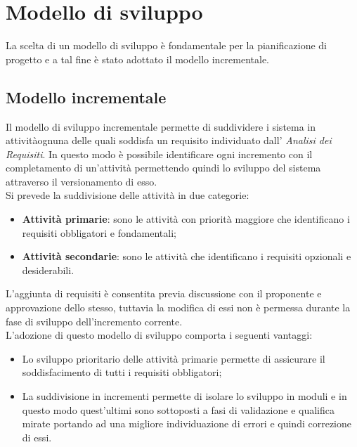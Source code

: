 \section{Modello di sviluppo}
La scelta di un modello di sviluppo è fondamentale per la pianificazione di 
progetto e a tal fine è stato adottato il modello incrementale.
\subsection{Modello incrementale}
Il modello di sviluppo incrementale permette di suddividere i sistema in 
attività\glosp ognuna delle quali soddisfa un requisito\glosp 
individuato dall' \textit{Analisi dei Requisiti}. In questo modo è possibile 
identificare ogni incremento con il completamento di un'attività permettendo 
quindi lo sviluppo del sistema attraverso il versionamento di esso. \\
Si prevede la suddivisione delle attività in due categorie: 
\begin{itemize}
	\item \textbf{Attività primarie}: sono le attività con priorità maggiore 
	che identificano i requisiti obbligatori e fondamentali;
	\item \textbf{Attività secondarie}: sono le attività che identificano i 
	requisiti opzionali e desiderabili.
\end{itemize}
L'aggiunta di requisiti è consentita previa discussione con il proponente e 
approvazione dello stesso, tuttavia la modifica di essi non è permessa 
durante la fase di sviluppo dell'incremento corrente.\\
L'adozione di questo modello di sviluppo comporta i seguenti vantaggi:
\begin{itemize}
	\item Lo sviluppo prioritario delle attività primarie permette di 
	assicurare il soddisfacimento di tutti i requisiti obbligatori;
	\item La suddivisione in incrementi permette di isolare lo sviluppo in 
	moduli e in questo modo quest'ultimi sono sottoposti a fasi di validazione 
	e qualifica mirate portando ad una migliore individuazione di errori e 
	quindi correzione di essi.
\end{itemize}

